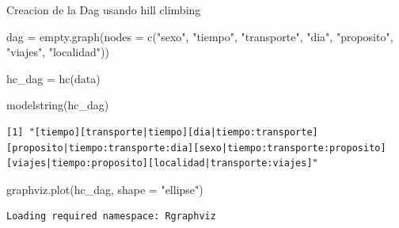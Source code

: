 \documentclass[
  11pt,
  a4paper,
]{article}
\newenvironment{Shaded}{\begin{snugshade}}{\end{snugshade}}
\newcommand{\AttributeTok}[1]{\textcolor[rgb]{0.40,0.45,0.13}{#1}}
\newcommand{\FunctionTok}[1]{\textcolor[rgb]{0.28,0.35,0.67}{#1}}
\newcommand{\NormalTok}[1]{\textcolor[rgb]{0.00,0.23,0.31}{#1}}
\newcommand{\OtherTok}[1]{\textcolor[rgb]{0.00,0.23,0.31}{#1}}
\newcommand{\StringTok}[1]{\textcolor[rgb]{0.13,0.47,0.30}{#1}}
\begin{document}
Creacion de la Dag usando hill climbing

\begin{Shaded}
\begin{Highlighting}[numbers=left,,]
\NormalTok{dag }\OtherTok{=} \FunctionTok{empty.graph}\NormalTok{(}\AttributeTok{nodes =} \FunctionTok{c}\NormalTok{(}\StringTok{"sexo"}\NormalTok{, }\StringTok{"tiempo"}\NormalTok{, }\StringTok{"transporte"}\NormalTok{, }\StringTok{"dia"}\NormalTok{, }\StringTok{"proposito"}\NormalTok{, }\StringTok{"viajes"}\NormalTok{, }\StringTok{"localidad"}\NormalTok{))}
\end{Highlighting}
\end{Shaded}

\begin{Shaded}
\begin{Highlighting}[numbers=left,,]
\NormalTok{hc\_dag }\OtherTok{=} \FunctionTok{hc}\NormalTok{(data)}
\end{Highlighting}
\end{Shaded}

\begin{Shaded}
\begin{Highlighting}[numbers=left,,]
\FunctionTok{modelstring}\NormalTok{(hc\_dag)}
\end{Highlighting}
\end{Shaded}

\begin{verbatim}
[1] "[tiempo][transporte|tiempo][dia|tiempo:transporte][proposito|tiempo:transporte:dia][sexo|tiempo:transporte:proposito][viajes|tiempo:proposito][localidad|transporte:viajes]"
\end{verbatim}

\begin{Shaded}
\begin{Highlighting}[numbers=left,,]
\FunctionTok{graphviz.plot}\NormalTok{(hc\_dag, }\AttributeTok{shape =} \StringTok{"ellipse"}\NormalTok{)}
\end{Highlighting}
\end{Shaded}

\begin{verbatim}
Loading required namespace: Rgraphviz
\end{verbatim}
\end{document}
